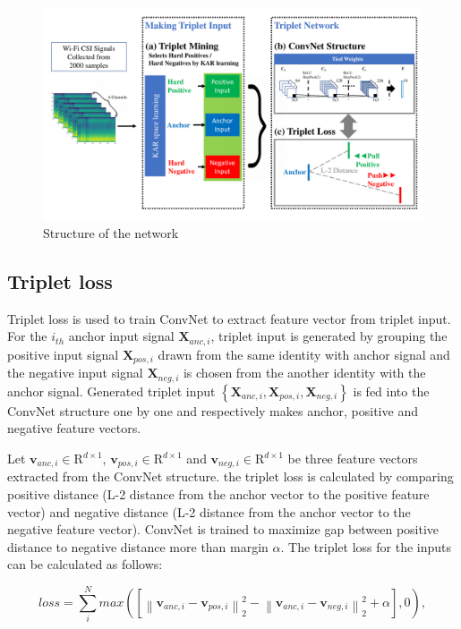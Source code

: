 \documentclass[runningheads]{llncs}
\begin{document}
\begin{figure}
    \includegraphics[width=\textwidth]{fig1_tcnn_kar_v3}
    \caption{Structure of the network} \label{fig1}
\end{figure}

\subsection{Triplet loss}

Triplet loss is used to train ConvNet to extract feature vector from triplet input.
For the $i_{th}$ anchor input signal $\mathbf{X}_{anc,i}$, triplet input is generated by grouping the positive input signal $\mathbf{X}_{pos,i}$ drawn from the same identity with anchor signal and the negative input signal $\mathbf{X}_{neg,i}$ is chosen from the another identity with the anchor signal.
Generated triplet input $\left\{\mathbf{X}_{anc,i},\mathbf{X}_{pos,i},\mathbf{X}_{neg,i}\right\}$ is fed into the ConvNet structure one by one and respectively makes anchor, positive and negative feature vectors.

Let $\mathbf{v}_{anc,i}\in{\mathrm{R}}^{d\times1}$, $\mathbf{v}_{pos,i}\in{\mathrm{R}}^{d\times1}$ and $\mathbf{v}_{neg,i}\in{\mathrm{R}}^{d\times1}$ be three feature vectors extracted from the ConvNet structure. 
the triplet loss is calculated by comparing positive distance (L-2 distance from the anchor vector to the positive feature vector) and negative distance (L-2 distance from the anchor vector to the negative feature vector).
ConvNet is trained to maximize gap between positive distance to negative distance more than margin $\alpha$.
The triplet loss for the inputs can be calculated as follows:

\begin{equation}
    loss = \sum_i^N max\left({ \left[ {\left\| {{\mathbf{v}_{anc,i}} - {\mathbf{v}_{pos,i}}} \right\|_2^2} - {\left\| {{\mathbf{v}_{anc,i}} - {\mathbf{v}_{neg,i}}} \right\|_2^2}  + \alpha \right]}, 0 \right),
\end{equation} 
\end{document}
